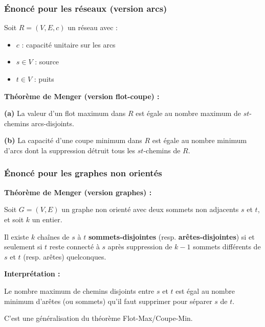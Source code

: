 \documentclass[12pt,a4paper]{article}
\begin{document}
\subsubsection{Énoncé pour les réseaux (version arcs)}

\begin{definition}
Soit $R = (V, E, c)$ un réseau avec :
\begin{itemize}
    \item $c$ : capacité unitaire sur les arcs
    \item $s \in V$ : source
    \item $t \in V$ : puits
\end{itemize}

\textbf{Théorème de Menger (version flot-coupe) :}

\textbf{(a)} La valeur d'un flot maximum dans $R$ est égale au nombre maximum de $st$-chemins arcs-disjoints.

\textbf{(b)} La capacité d'une coupe minimum dans $R$ est égale au nombre minimum d'arcs dont la suppression détruit tous les $st$-chemins de $R$.
\end{definition}

\subsubsection{Énoncé pour les graphes non orientés}

\begin{definition}
\textbf{Théorème de Menger (version graphes) :}

Soit $G = (V,E)$ un graphe non orienté avec deux sommets non adjacents $s$ et $t$, et soit $k$ un entier.

Il existe $k$ chaînes de $s$ à $t$ \textcolor{titrebleu}{\textbf{sommets-disjointes}} (resp. \textcolor{defvert}{\textbf{arêtes-disjointes}}) si et seulement si $t$ reste connecté à $s$ après suppression de $k-1$ sommets différents de $s$ et $t$ (resp. arêtes) quelconques.
\end{definition}

\begin{notecours}
\textbf{Interprétation :}

Le nombre maximum de chemins disjoints entre $s$ et $t$ est égal au nombre minimum d'arêtes (ou sommets) qu'il faut supprimer pour séparer $s$ de $t$.

C'est une généralisation du théorème Flot-Max/Coupe-Min.
\end{notecours}
\end{document}
